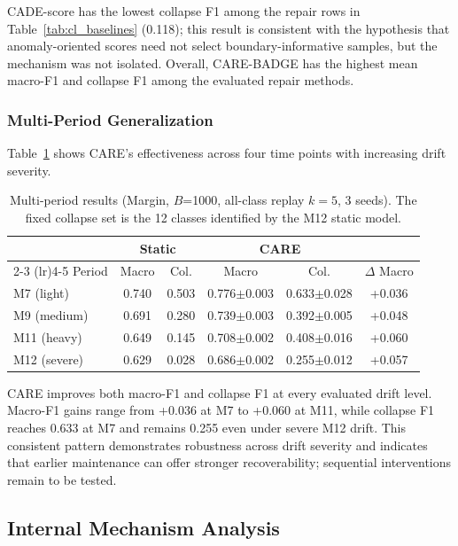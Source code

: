 \documentclass[journal]{IEEEtran}
\newcommand{\ours}{CARE}  %
\begin{document}
CADE-score has the lowest collapse F1 among the repair rows in Table~\ref{tab:cl_baselines} (0.118); this result is consistent with the hypothesis that anomaly-oriented scores need not select boundary-informative samples, but the mechanism was not isolated. Overall, \ours{}-BADGE has the highest mean macro-F1 and collapse F1 among the evaluated repair methods.

\subsubsection{Multi-Period Generalization}
\label{sec:multi_period}

Table~\ref{tab:multiperiod} shows \ours{}'s effectiveness across four time points with increasing drift severity.

\begin{table}[!htbp]
\centering
\caption{Multi-period results (Margin, $B$=1000, all-class replay $k{=}5$, 3 seeds). The fixed collapse set is the 12 classes identified by the M12 static model.}
\label{tab:multiperiod}
\scriptsize
\setlength{\tabcolsep}{3pt}
\begin{tabular}{@{}l cc cc c@{}}
\toprule
& \multicolumn{2}{c}{Static} & \multicolumn{2}{c}{\ours{}} & \\
\cmidrule(lr){2-3} \cmidrule(lr){4-5}
Period & Macro & Col. & Macro & Col. & $\Delta$ Macro \\
\midrule
M7 (light)   & 0.740 & 0.503 & 0.776$\pm$0.003 & 0.633$\pm$0.028 & +0.036 \\
M9 (medium)  & 0.691 & 0.280 & 0.739$\pm$0.003 & 0.392$\pm$0.005 & +0.048 \\
M11 (heavy)  & 0.649 & 0.145 & 0.708$\pm$0.002 & 0.408$\pm$0.016 & +0.060 \\
M12 (severe) & 0.629 & 0.028 & 0.686$\pm$0.002 & 0.255$\pm$0.012 & +0.057 \\
\bottomrule
\end{tabular}
\end{table}

\ours{} improves both macro-F1 and collapse F1 at every evaluated drift level. Macro-F1 gains range from +0.036 at M7 to +0.060 at M11, while collapse F1 reaches 0.633 at M7 and remains 0.255 even under severe M12 drift. This consistent pattern demonstrates robustness across drift severity and indicates that earlier maintenance can offer stronger recoverability; sequential interventions remain to be tested.

\subsection{Internal Mechanism Analysis}
\label{sec:mechanism_analysis}
\end{document}
